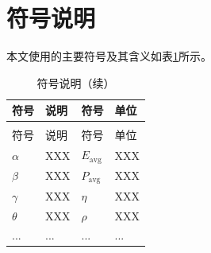 
\section{符号说明}

本文使用的主要符号及其含义如表\ref{tab:符号说明}所示。

\begin{longtable}{>{\centering\arraybackslash}p{}>{\centering\arraybackslash}p{}>{\centering\arraybackslash}p{}>{\centering\arraybackslash}p{}}
  \caption{符号说明}
  \label{tab:符号说明} \\
  \toprule
  符号 & 说明 & 符号 & 单位 \\
  \midrule
  \endfirsthead
  \caption{符号说明（续）} \\
  \toprule
  符号 & 说明 & 符号 & 单位 \\
  \midrule
  \endhead
  \bottomrule
  \endfoot
  $\alpha$ & XXX & $E_{\text{avg}}$ & XXX \\
  $\beta$ & XXX & $P_{\text{avg}}$ & XXX \\
  $\gamma$ & XXX & $\eta$ & XXX \\
  $\theta$ & XXX & $\rho$ & XXX \\
  ... & ... & ... & ... \\
\end{longtable}
